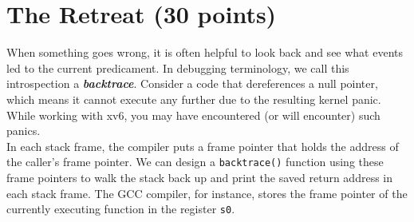 \documentclass[11pt]{exam}
\begin{document}
\begin{questions}
\end{questions}

\section{The Retreat (30 points)}

When something goes wrong, it is often helpful to look back and see what events led to the current predicament. In debugging terminology, we call this introspection a \textbf{{\em backtrace}}. Consider a code that dereferences a null pointer, which means it cannot execute any further due to the resulting kernel panic. While working with xv6, you may have encountered (or will encounter) such panics. \\

\noindent In each stack frame, the compiler puts a frame pointer that holds the address of the caller's frame pointer. We can design a \texttt{backtrace()} function using these frame pointers to walk the stack back up and print the saved return address in each stack frame. The GCC compiler, for instance, stores the frame pointer of the currently executing function in the register {\tt s0}. 
\end{document}
